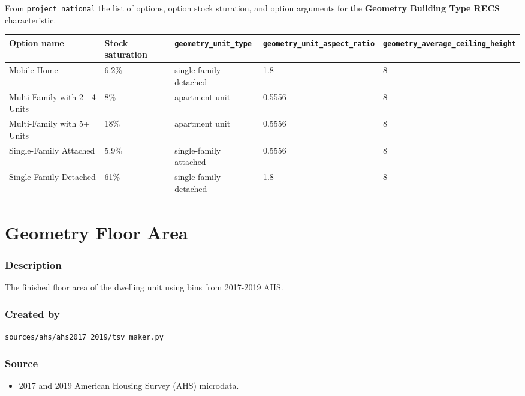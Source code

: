 From \texttt{project\_national} the list of options, option stock
sturation, and option arguments for the \textbf{Geometry Building Type
RECS} characteristic.

\begin{longtable}[]{@{}lllll@{}}
\toprule\noalign{}
Option name & Stock saturation & \texttt{geometry\_unit\_type} &
\texttt{geometry\_unit\_aspect\_ratio} &
\texttt{geometry\_average\_ceiling\_height} \\
\midrule\noalign{}
\endhead
\bottomrule\noalign{}
\endlastfoot
Mobile Home & 6.2\% & single-family detached & 1.8 & 8 \\
Multi-Family with 2 - 4 Units & 8\% & apartment unit & 0.5556 & 8 \\
Multi-Family with 5+ Units & 18\% & apartment unit & 0.5556 & 8 \\
Single-Family Attached & 5.9\% & single-family attached & 0.5556 & 8 \\
Single-Family Detached & 61\% & single-family detached & 1.8 & 8 \\
\end{longtable}

\section{Geometry Floor Area}\label{geometry_floor_area}

\subsubsection{Description}\label{description-52}

The finished floor area of the dwelling unit using bins from 2017-2019
AHS.

\subsubsection{Created by}\label{created-by-52}

\texttt{sources/ahs/ahs2017\_2019/tsv\_maker.py}

\subsubsection{Source}\label{source-51}

\begin{itemize}
 
\item
  2017 and 2019 American Housing Survey (AHS) microdata.
\end{itemize}

